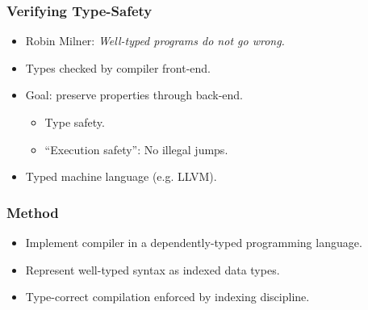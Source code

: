 \documentclass[t,fleqn,usenames,dvipsnames]{beamer}
\newcommand{\cAnn}{\color{red!80!black}}%
\renewcommand{\emph}[1]{{\cAnn#1}}
\newcommand{\cType}{\color{orange!60!black}}
\renewcommand{\emph}[1]{\textit{\cType#1}}
\begin{document}
\begin{frame}%
  \frametitle{Verifying Type-Safety}
  \vspace{-3ex}
  \begin{itemize}
  \item Robin Milner: \emph{Well-typed programs do not go wrong.}
  \item Types checked by compiler front-end.
  \item Goal: preserve properties through back-end.
    \begin{itemize}
    \item Type safety.
    \item ``Execution safety'': No illegal jumps.
    \end{itemize}
  \item Typed machine language (e.g. LLVM).
  \end{itemize}
\end{frame}


\begin{frame}%
  \frametitle{Method}
  \vspace{-3ex}
  \begin{itemize}
  \item Implement compiler in a dependently-typed programming
    language.
  \item Represent well-typed syntax as indexed data types.
  \item Type-correct compilation enforced by indexing discipline.
  \end{itemize}
\end{frame}
\end{document}

